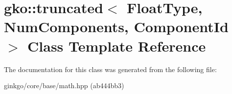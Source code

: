 \hypertarget{classgko_1_1truncated}{}\section{gko\+:\+:truncated$<$ Float\+Type, Num\+Components, Component\+Id $>$ Class Template Reference}
\label{classgko_1_1truncated}


The documentation for this class was generated from the following file\+:\begin{DoxyCompactItemize}
\item 
ginkgo/core/base/math.\+hpp (ab444bb3)\end{DoxyCompactItemize}
